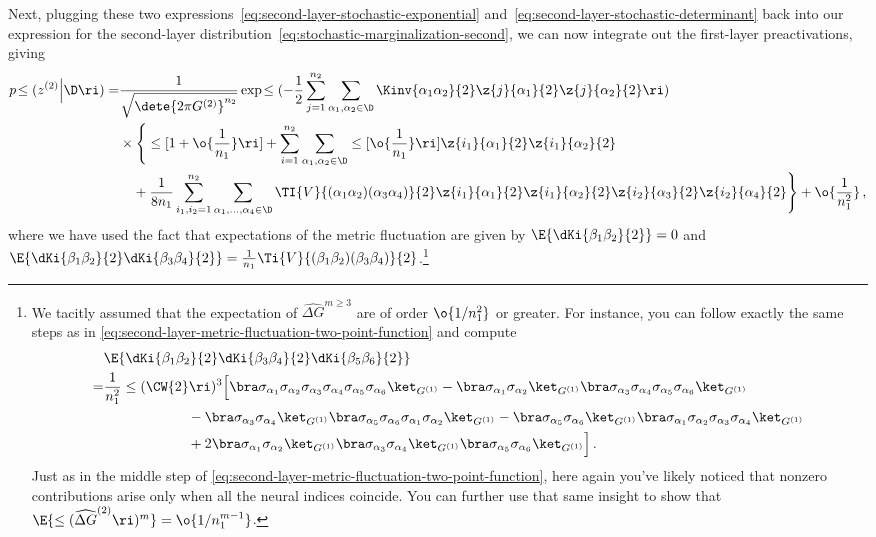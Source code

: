 Next, plugging these two expressions~\eqref{eq:second-layer-stochastic-exponential} and~\eqref{eq:second-layer-stochastic-determinant} back into our expression for the second-layer distribution~\eqref{eq:stochastic-marginalization-second}, we can now integrate out the first-layer preactivations, giving
\begin{align}
p\!\le(z^{(2)}\Big\vert\D\ri)=&\frac{1}{\sqrt{\dete{2\pi G^{(2)}}^{n_2}}}\exp\!\le(-\frac{1}{2}\sum_{j=1}^{n_2}\sum_{\alpha_1,\alpha_2\in\D}\Kinv{\alpha_1 \alpha_2}{2}\z{j}{\alpha_1}{2}\z{j}{\alpha_2}{2}\ri)\, \\
&\times\Bigg\{ \le[1+\o{\frac{1}{n_1}}\ri]+\sum_{i=1}^{n_2}\sum_{\alpha_1,\alpha_{2}\in\D}\le[\o{\frac{1}{n_1}}\ri]\z{i_1}{\alpha_1}{2}\z{i_1}{\alpha_2}{2}\,\nonumber\\
&\quad +\frac{1}{8n_1}\sum_{i_1,i_2=1}^{n_2}\sum_{\alpha_1,\ldots,\alpha_{4}\in\D}\TI{V}{(\alpha_1\alpha_2)(\alpha_3\alpha_4)}{2} \z{i_1}{\alpha_1}{2}\z{i_1}{\alpha_2}{2}\z{i_2}{\alpha_{3}}{2}\z{i_2}{\alpha_{4}}{2}\Bigg\}+\o{\frac{1}{n_1^2}}\,, \nonumber
\end{align}
where we have used the fact that expectations of the metric fluctuation are given by $\E{\dKi{\beta_1\beta_2}{2}}=0$ and $\E{\dKi{\beta_1\beta_2}{2}\dKi{\beta_3\beta_4}{2}}=\frac{1}{n_1}\Ti{V}{(\beta_1\beta_2)(\beta_3\beta_4)}{2}$.\footnote{We tacitly assumed that the expectation of $\widehat{\Delta G}^{m\geq3}$ are of order $\o{1/n_1^2}$ or greater.\label{foot:second-layer-hierarchy}
For instance, you can follow exactly the same steps as in \eqref{eq:second-layer-metric-fluctuation-two-point-function} and compute
\begin{align}
&\E{\dKi{\beta_1\beta_2}{2}\dKi{\beta_3\beta_4}{2}\dKi{\beta_5\beta_6}{2}}\, \\
=&\frac{1}{n_1^2}\le(\CW{2}\ri)^3\Big[\bra\sigma_{\alpha_1} \sigma_{\alpha_2} \sigma_{\alpha_3} \sigma_{\alpha_4}\sigma_{\alpha_5} \sigma_{\alpha_6}\ket_{G^{(1)}}  - \bra\sigma_{\alpha_1} \sigma_{\alpha_2}\ket_{G^{(1)}}\bra\sigma_{\alpha_3} \sigma_{\alpha_4}\sigma_{\alpha_5} \sigma_{\alpha_6}\ket_{G^{(1)}}\, \notag\\
&\qquad\qquad\qquad- \bra\sigma_{\alpha_3} \sigma_{\alpha_4}\ket_{G^{(1)}}\bra\sigma_{\alpha_5} \sigma_{\alpha_6}\sigma_{\alpha_1} \sigma_{\alpha_2}\ket_{G^{(1)}}- \bra\sigma_{\alpha_5} \sigma_{\alpha_6}\ket_{G^{(1)}}\bra\sigma_{\alpha_1} \sigma_{\alpha_2}\sigma_{\alpha_3} \sigma_{\alpha_4}\ket_{G^{(1)}}\, \notag\\
&\qquad\qquad\qquad+2\bra\sigma_{\alpha_1} \sigma_{\alpha_2}\ket_{G^{(1)}}\bra\sigma_{\alpha_3} \sigma_{\alpha_4}\ket_{G^{(1)}}\bra\sigma_{\alpha_5} \sigma_{\alpha_6}\ket_{G^{(1)}}\Big]\, .\notag
\end{align}
Just as in the middle step of \eqref{eq:second-layer-metric-fluctuation-two-point-function}, here again you've likely noticed that nonzero contributions arise only when all the neural indices coincide. You can further use that same insight to show that $\E{\le(\widehat{\Delta G}^{(2)}\ri)^{m}}=\o{1/n^{m-1}_1}$.
}
